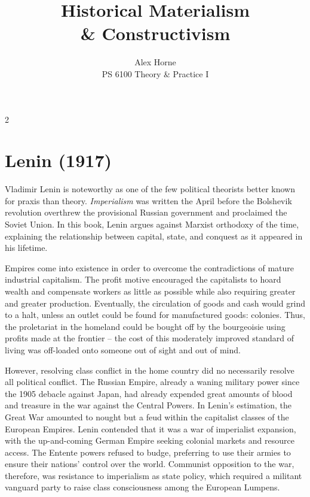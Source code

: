 \documentclass[letterpaper,12pt]{article}
\title{\fontfamily{phv}\selectfont \textbf{Historical Materialism \\ \& Constructivism}}
\author{\fontfamily{phv}\selectfont Alex Horne \\ \fontfamily{phv} \selectfont PS 6100 Theory \& Practice I}
\date{\fontfamily{phv}\selectfont}
\begin{document}
\maketitle

\begin {multicols}{2}
\section*{Lenin (1917)}

Vladimir Lenin is noteworthy as one of the few political theorists better known for praxis than theory. \textit{Imperialism} was written the April before the Bolshevik revolution overthrew the provisional Russian government and proclaimed the Soviet Union. In this book, Lenin argues against Marxist orthodoxy of the time, explaining the relationship between capital, state, and conquest as it appeared in his lifetime.

Empires come into existence in order to overcome the contradictions of mature industrial capitalism. The profit motive encouraged the capitalists to hoard wealth and compensate workers as little as possible while also requiring greater and greater production. Eventually, the circulation of goods and cash would grind to a halt, unless an outlet could be found for manufactured goods: colonies. Thus, the proletariat in the homeland could be bought off by the bourgeoisie using profits made at the frontier – the cost of this moderately improved standard of living was off-loaded onto someone out of sight and out of mind.

However, resolving class conflict in the home country did no necessarily resolve all political conflict. The Russian Empire, already a waning military power since the 1905 debacle against Japan, had already expended great amounts of blood and treasure in the war against the Central Powers. In Lenin's estimation, the Great War amounted to nought but a feud within the capitalist classes of the European Empires.  Lenin contended that it was a war of imperialist expansion, with the up-and-coming German Empire seeking colonial markets and resource access. The Entente powers refused to budge, preferring to use their armies to ensure their nations' control over the world. Communist opposition to the war, therefore, was resistance to imperialism as state policy, which required a militant vanguard party to raise class consciousness among the European Lumpens.


\end{multicols}
\end{document}

